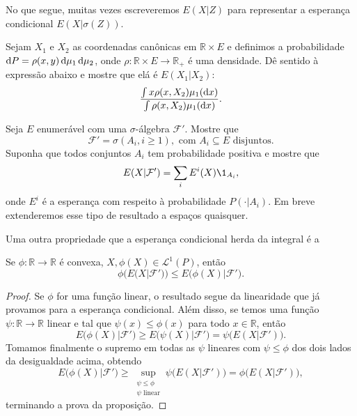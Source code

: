 No que segue, muitas vezes escreveremos $E(X|Z)$ para representar a esperança condicional $E(X|\sigma(Z))$.

\begin{exercise}
  Sejam $X_1$ e $X_2$ as coordenadas canônicas em $\mathbb{R} \times E$ e definimos a probabilidade $\mathop{}\!\mathrm{d} P = \rho(x,y) \mathop{}\!\mathrm{d} \mu_1 \mathop{}\!\mathrm{d} \mu_2$, onde $\rho:\mathbb{R} \times E \to \mathbb{R}_+$ é uma densidade.
  Dê sentido à expressão abaixo e mostre que elá é $E(X_1|X_2)$:
  \begin{equation}
     \frac{\int x\rho(x, X_2) \mu_1(\mathop{}\!\mathrm{d} x)}{\int \rho(x, X_2) \mu_1(\mathop{}\!\mathrm{d} x)}.
  \end{equation}
\end{exercise}

\begin{exercise}
  Seja $E$ enumerável com uma $\sigma$-álgebra $\mathcal{F}'$.
  Mostre que
  \begin{equation}
    \mathcal{F}' = \sigma(A_i, i \geq 1), \text{ com $A_i \subseteq E$ disjuntos}.
  \end{equation}
  Suponha que todos conjuntos $A_i$ tem probabilidade positiva e mostre que
  \begin{equation}
    E(X|\mathcal{F}') = \sum_i E^i(X) \1_{A_i},
  \end{equation}
  onde $E^i$ é a esperança com respeito à probabilidade $P(\cdot|A_i)$.
  Em breve extenderemos esse tipo de resultado a espaços quaisquer.
\end{exercise}

Uma outra propriedade que a esperança condicional herda da integral é a

\begin{proposition}
  Se $\phi:\mathbb{R} \to \mathbb{R}$ é convexa, $X, \phi(X) \in \mathcal{L}^1(P)$, então
  \begin{equation}
    \phi\big( E(X|\mathcal{F}') \big) \leq E\big( \phi(X) | \mathcal{F}' \big).
  \end{equation}
\end{proposition}

\begin{proof}
  Se $\phi$ for uma função linear, o resultado segue da linearidade que já provamos para a esperança condicional.
  Além disso, se temos uma função $\psi:\mathbb{R} \to \mathbb{R}$ linear e tal que $\psi(x) \leq \phi(x)$ para todo $x \in \mathbb{R}$, então
  \begin{equation}
    E\big( \phi(X) | \mathcal{F}' \big) \geq E\big( \psi(X) | \mathcal{F}' \big) = \psi \big( E(X|\mathcal{F}') \big).
  \end{equation}
  Tomamos finalmente o supremo em todas as $\psi$ lineares com $\psi \leq \phi$ dos dois lados da desigualdade acima, obtendo
  \begin{equation}
    E\big( \phi(X) | \mathcal{F}' \big) \geq \sup_{\substack{\psi \leq \phi\\\psi \text{ linear}}} \psi \big( E(X|\mathcal{F}') \big) = \phi \big( E(X|\mathcal{F}') \big),
  \end{equation}
  terminando a prova da proposição.
\end{proof}

